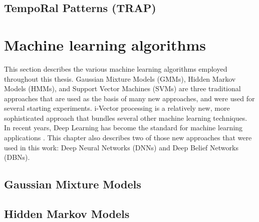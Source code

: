 \subsection{TempoRal Patterns (TRAP)}

\section{Machine learning algorithms}
This section describes the various machine learning algorithms employed throughout this thesis. Gaussian Mixture Models (GMMs), Hidden Markov Models (HMMs), and Support Vector Machines (SVMs) are three traditional approaches that are used as the basis of many new approaches, and were used for several starting experiments. i-Vector processing is a relatively new, more sophisticated approach that bundles several other machine learning techniques.\\
In recent years, Deep Learning has become the standard for machine learning applications \cite{}. This chapter also describes two of those new approaches that were used in this work: Deep Neural Networks (DNNs) and Deep Belief Networks (DBNs).

\subsection{Gaussian Mixture Models}
\subsection{Hidden Markov Models}
